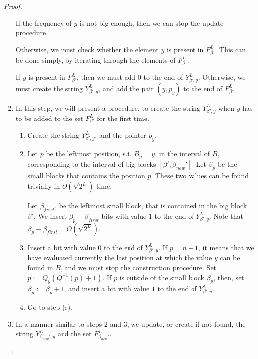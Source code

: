 \documentclass[runningheads]{llncs}
\begin{document}
\begin{proof}
\begin{enumerate}
        If the frequency of $y$ is not big enough, then we can stop the update procedure.

        Otherwise, we must check whether the element $y$ is present in $F^L_{\beta'}$. 
        This can be done simply, by iterating through the elements of $F^L_{\beta'}$. 

        If $y$ is present in $F^L_{\beta'}$, then we must add $0$ to the end of $Y^L_{\beta', y}$.
        Otherwise, we must create the string $Y^L_{\beta', y}$, and add the pair $(y, p_y)$ to the end of $F^L_{\beta'}$.
        
        \item In this step, we will present a procedure, to create the string $Y^L_{\beta', y}$ 
        when $y$ has to be added to the set $F^L_{\beta'}$ for the first time.
            \begin{enumerate}
                \item Create the string $Y_{\beta', y}^L$, and the pointer $p_y$.
                \item 
                Let $p$ be the leftmost position, s.t. $B_p=y$, in the interval of $B$, corresponding to the interval of big blocks $[\beta',\beta_{new}']$.
                Let $\beta_p$ be the small blocks that contains the position $p$. 
                These two values can be found trivially in $O(\sqrt{2^L})$ time.
                
                Let $\beta_{first}$, be the leftmost small block, that is contained in the big block $\beta'$.
                We insert $\beta_{p}-\beta_{first}$ bits with value $1$ to the end of $Y_{\beta', y}^L$.
                Note that $\beta_{p}-\beta_{first}=O(\sqrt{2^L})$.
                \item  
                    Insert a bit with value $0$ to the end of $Y_{\beta', y}^L$.
                    If $p=n+1$, it means that we have evaluated currently the last position at which the value $y$ can be found in $B$, and we must stop the construction procedure.
                    Set $p:=Q_{y}( Q^{-1}(p)+1 )$.
                    If $p$ is outside of the small block $\beta_p$, then, set $\beta_p:=\beta_p+1$, 
                    and insert a bit with value $1$ to the end of $Y_{\beta', y}^L$.
                \item Go to step (c).
            \end{enumerate}
        
        \item In a manner similar to steps $2$ and $3$, we update, or create if not found, the string $Y_{\beta_{new}', y}^{L}$ and the set $F_{\beta_{new}'}^L$.
        

\end{enumerate}
\end{proof}
\end{document}
